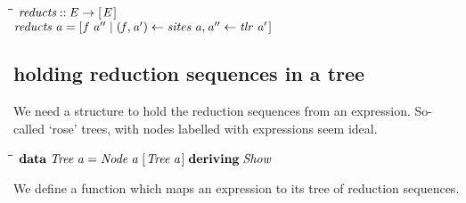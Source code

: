 \documentclass{article}
\newlength{\lwidth}\setlength{\lwidth}{4.5cm}
\newlength{\cwidth}\setlength{\cwidth}{8mm} %
\newcommand{\Conid}[1]{\mathit{#1}}
\newcommand{\Varid}[1]{\mathit{#1}}
\begin{document}
\begin{tabbing}
\qquad\=\hspace{\lwidth}\=\hspace{\cwidth}\=\+\kill
${\Varid{reducts}\mathbin{::}\Conid{E}\to [\mskip1.5mu \Conid{E}\mskip1.5mu]}$\\
${\Varid{reducts}\;\Varid{a}\mathrel{=}[\mskip1.5mu \Varid{f}\;\Varid{a''}\mid (\Varid{f},\Varid{a'})\leftarrow \Varid{sites}\;\Varid{a},\Varid{a''}\leftarrow \Varid{tlr}\;\Varid{a'}\mskip1.5mu]}$
\end{tabbing}
\subsection{holding reduction sequences in a tree}

We need a structure to hold the reduction sequences from an
expression.  So-called `rose' trees, with nodes labelled with
expressions seem ideal.

\begin{tabbing}
\qquad\=\hspace{\lwidth}\=\hspace{\cwidth}\=\+\kill
${\mathbf{data}\;\Conid{Tree}\;\Varid{a}\mathrel{=}\Conid{Node}\;\Varid{a}\;[\mskip1.5mu \Conid{Tree}\;\Varid{a}\mskip1.5mu]\;\mathbf{deriving}\;\Conid{Show}}$
\end{tabbing}
We define a function which maps an expression to its tree of 
reduction sequences.
\end{document}
